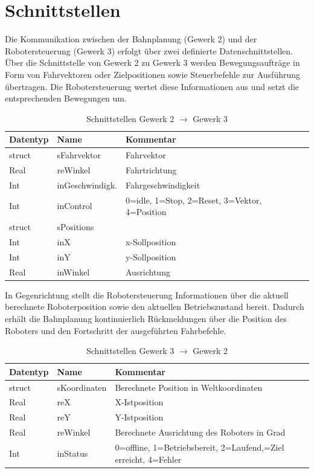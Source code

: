 \section{Schnittstellen}
\label{sec:Schnittstellen}
Die Kommunikation zwischen der Bahnplanung (Gewerk 2) und der Robotersteuerung (Gewerk 3) erfolgt über zwei definierte Datenschnittstellen. Über die Schnittstelle von Gewerk 2 zu Gewerk 3 werden Bewegungsaufträge in Form von Fahrvektoren oder Zielpositionen sowie Steuerbefehle zur Ausführung übertragen. Die Robotersteuerung wertet diese Informationen aus und setzt die entsprechenden Bewegungen um.
\begin{table}[H]
    \centering
    \caption{Schnittstellen Gewerk 2 $\rightarrow$ Gewerk 3}
    \begin{tabular}{l|l|l}
    \toprule
    \textbf{Datentyp} & \textbf{Name} & \textbf{Kommentar} \\
    \midrule
    struct & sFahrvektor & Fahrvektor \\
    \quad Real & reWinkel & Fahrtrichtung \\
    \quad Int & inGeschwindigk. & Fahrgeschwindigkeit \\
    Int & inControl & 0=idle, 1=Stop, 2=Reset, 3=Vektor, 4=Position \\
    struct & sPositions & \\
    \quad Int & inX & x-Sollposition \\
    \quad Int & inY & y-Sollposition \\
    \quad Real & inWinkel & Ausrichtung \\
    \bottomrule
    \end{tabular} 
\end{table}
In Gegenrichtung stellt die Robotersteuerung Informationen über die aktuell berechnete Roboterposition sowie den aktuellen Betriebszustand bereit. Dadurch erhält die Bahnplanung kontinuierlich Rückmeldungen über die Position des Roboters und den Fortschritt der ausgeführten Fahrbefehle.

\begin{table}[H]
    \centering
    \caption{Schnittstellen Gewerk 3 $\rightarrow$ Gewerk 2}
    \begin{tabular}{l|l|p{9cm}}
    \toprule
    \textbf{Datentyp} & \textbf{Name} & \textbf{Kommentar} \\
    \midrule
    struct & sKoordinaten & Berechnete Position in Weltkoordinaten \\
    \quad Real & reX & X-Istposition \\
    \quad Real & reY & Y-Istposition \\
    \quad Real & reWinkel & Berechnete Ausrichtung des Roboters in Grad \\
    Int & inStatus & 0=offline, 1=Betriebsbereit, 2=Laufend,\newline
    3=Ziel erreicht, 4=Fehler \\
    \bottomrule
    \end{tabular}
\end{table}

